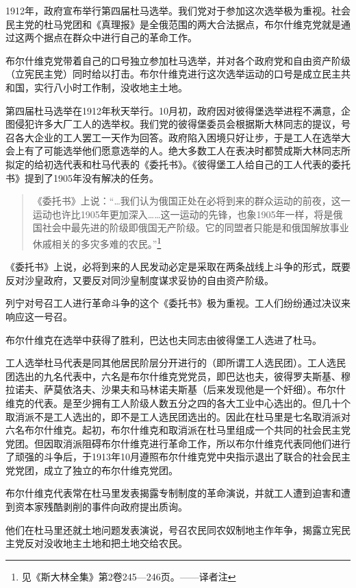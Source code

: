 1912年，政府宣布举行第四届杜马选举。我们党对于参加这次选举极为重视。社会民主党的杜马党团和《真理报》是全俄范围的两大合法据点，布尔什维克党就是通过这两个据点在群众中进行自己的革命工作。

布尔什维克党带着自己的口号独立参加杜马选举，并对各个政府党和自由资产阶级（立宪民主党）同时给以打击。布尔什维克进行这次选举运动的口号是成立民主共和国，实行八小时工作制，没收地主土地。

第四届杜马选举在1912年秋天举行。10月初，政府因对彼得堡选举进程不满意，企图侵犯许多大厂工人的选举权。我们党的彼得堡委员会根据斯大林同志的提议，号召各大企业的工人罢工一天作为回答。政府陷入困境只好让步，于是工人在选举大会上有了可能选举他们愿意选举的人。绝大多数工人在表决时都赞成斯大林同志所拟定的给初选代表和杜马代表的《委托书》。《彼得堡工人给自己的工人代表的委托书》提到了1905年没有解决的任务。

\begin{quotation}
《委托书》上说：“…我们认为俄国正处在必将到来的群众运动的前夜，这一运动也许比1905年更加深入……这一运动的先锋，也象1905年一样，将是俄国社会中最先进的阶级即俄国无产阶级。它的同盟者只能是和俄国解放事业休戚相关的多灾多难的农民。”\footnote{见《斯大林全集》第2卷245—246页。——译者注}
\end{quotation}

《委托书》上说，必将到来的人民发动必定是采取在两条战线上斗争的形式，既要反对沙皇政府，又要反对同沙皇制度谋求妥协的自由资产阶级。

列宁对号召工人进行革命斗争的这个《委托书》极为重视。工人们纷纷通过决议来响应这一号召。

布尔什维克在选举中获得了胜利，巴达也夫同志由彼得堡工人选进了杜马。

工人选举杜马代表是同其他居民阶层分开进行的（即所谓工人选民团）。工人选民团选出的九名代表中，六名是布尔什维克党党员，即巴达也夫，彼得罗夫斯基、穆拉诺夫、萨莫依洛夫、沙果夫和马林诺夫斯基（后来发现他是一个奸细）。布尔什维克的代表。是至少拥有工人阶级人数五分之四的各大工业中心选出的。但几十个取消派不是工人选出的，即不是工人选民团选出的。因此在杜马里是七名取消派对六名布尔什维克。起初，布尔什维克和取消派在杜马里组成一个共同的社会民主党党团。但因取消派阻碍布尔什维克进行革命工作，所以布尔什维克代表同他们进行了顽强的斗争后，于1913年10月遵照布尔什维克党中央指示退出了联合的社会民主党党团，成立了独立的布尔什维克党团。

布尔什维克代表常在杜马里发表揭露专制制度的革命演说，并就工人遭到迫害和遭到资本家残酷剥削的事件向政府提出质询。

他们在杜马里还就土地问题发表演说，号召农民同农奴制地主作年争，揭露立宪民主党反对没收地主土地和把土地交给农民。

